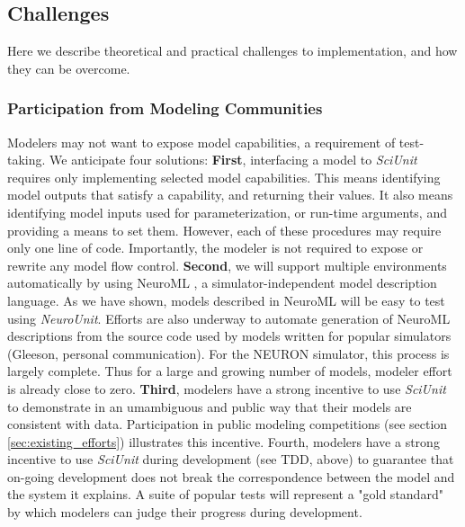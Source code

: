 \documentclass[11pt,letterpaper]{article}
\begin{document}
\subsection{Challenges}
Here we describe theoretical and practical challenges to implementation, and how they can be overcome.

\subsubsection{Participation from Modeling Communities}
Modelers may not want to expose model capabilities, a requirement of test-taking.  We anticipate four solutions: \textbf{First}, interfacing a model to \textit{SciUnit} requires only implementing selected model capabilities.  This means identifying model outputs that satisfy a capability, and returning their values.  It also means identifying model inputs used for parameterization, or run-time arguments, and providing a means to set them.  However, each of these procedures may require only one line of code.  Importantly, the modeler is not required to expose or rewrite any model flow control.  \textbf{Second}, we will support multiple environments automatically by using NeuroML \cite{gleeson_neuroml:_2010}, a simulator-independent model description language. As we have shown, models described in NeuroML will be easy to test using \textit{NeuroUnit}.  Efforts are also underway to automate generation of NeuroML descriptions from the source code used by models written for popular simulators (Gleeson, personal communication).  For the NEURON simulator, this process is largely complete.  Thus for a large and growing number of models, modeler effort is already close to zero.  \textbf{Third}, modelers have a strong incentive to use \textit{SciUnit} to demonstrate in an umambiguous and public way that their models are consistent with data.  Participation in public modeling competitions (see section \ref{sec:existing_efforts}) illustrates this incentive.  Fourth, modelers have a strong incentive to use \textit{SciUnit} during development (see TDD, above) to guarantee that on-going development does not break the correspondence between the model and the system it explains.  A suite of popular tests will represent a "gold standard" by which modelers can judge their progress during development.
\end{document}
